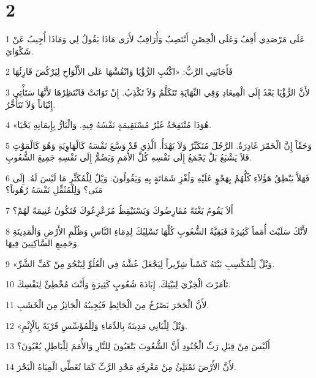 \chapter{2}

\par 1 عَلَى مَرْصَدِي أَقِفُ وَعَلَى الْحِصْنِ أَنْتَصِبُ وَأُرَاقِبُ لأَرَى مَاذَا يَقُولُ لِي وَمَاذَا أُجِيبُ عَنْ شَكْوَايَ.
\par 2 فَأَجَابَنِي الرَّبُّ: «اكْتُبِ الرُّؤْيَا وَانْقُشْهَا عَلَى الأَلْوَاحِ لِيَرْكُضَ قَارِئُهَا
\par 3 لأَنَّ الرُّؤْيَا بَعْدُ إِلَى الْمِيعَادِ وَفِي النِّهَايَةِ تَتَكَلَّمُ وَلاَ تَكْذِبُ. إِنْ تَوَانَتْ فَانْتَظِرْهَا لأَنَّهَا سَتَأْتِي إِتْيَاناً وَلاَ تَتَأَخَّرُ.
\par 4 «هُوَذَا مُنْتَفِخَةٌ غَيْرُ مُسْتَقِيمَةٍ نَفْسُهُ فِيهِ. وَالْبَارُّ بِإِيمَانِهِ يَحْيَا.
\par 5 وَحَقّاً إِنَّ الْخَمْرَ غَادِرَةٌ. الرَّجُلَ مُتَكَبِّرٌ وَلاَ يَهْدَأُ. الَّذِي قَدْ وَسَّعَ نَفْسَهُ كَالْهَاوِيَةِ وَهُوَ كَالْمَوْتِ فَلاَ يَشْبَعُ بَلْ يَجْمَعُ إِلَى نَفْسِهِ كُلَّ الأُمَمِ وَيَضُمُّ إِلَى نَفْسِهِ جَمِيعَ الشُّعُوبِ.
\par 6 فَهَلاَّ يَنْطِقُ هَؤُلاَءِ كُلُّهُمْ بِهَجْوٍ عَلَيْهِ وَلُغْزِ شَمَاتَةٍ بِهِ وَيَقُولُونَ: وَيْلٌ لِلْمُكَثِّرِ مَا لَيْسَ لَهُ. إِلَى مَتَى؟ وَلِلْمُثَقِّلِ نَفْسَهُ رُهُوناً؟
\par 7 أَلاَ يَقُومُ بَغْتَةً مُقَارِضُوكَ وَيَسْتَيْقِظُ مُزَعْزِعُوكَ فَتَكُونُ غَنِيمَةً لَهُمْ؟
\par 8 لأَنَّكَ سَلَبْتَ أُمَماً كَثِيرَةً فَبَقِيَّةُ الشُّعُوبِ كُلِّهَا تَسْلِبُكَ لِدِمَاءِ النَّاسِ وَظُلْمِ الأَرْضِ وَالْمَدِينَةِ وَجَمِيعِ السَّاكِنِينَ فِيهَا.
\par 9 «وَيْلٌ لِلْمُكْسِبِ بَيْتَهُ كَسْباً شِرِّيراً لِيَجْعَلَ عُشَّهُ فِي الْعُلُوِّ لِيَنْجُوَ مِنْ كَفِّ الشَّرِّ.
\par 10 تَآمَرْتَ الْخِزْيَ لِبَيْتِكَ. إِبَادَةَ شُعُوبٍ كَثِيرَةٍ وَأَنْتَ مُخْطِئٌ لِنَفْسِكَ.
\par 11 لأَنَّ الْحَجَرَ يَصْرُخُ مِنَ الْحَائِطِ فَيُجِيبُهُ الْجَائِزُ مِنَ الْخَشَبِ.
\par 12 «وَيْلٌ لِلْبَانِي مَدِينَةً بِالدِّمَاءِ وَلِلْمُؤَسِّسِ قَرْيَةً بِالْإِثْمِ.
\par 13 أَلَيْسَ مِنْ قِبَلِ رَبِّ الْجُنُودِ أَنَّ الشُّعُوبَ يَتْعَبُونَ لِلنَّارِ وَالأُمَمَ لِلْبَاطِلِ يُعْيُونَ؟
\par 14 لأَنَّ الأَرْضَ تَمْتَلِئُ مِنْ مَعْرِفَةِ مَجْدِ الرَّبِّ كَمَا تُغَطِّي الْمِيَاهُ الْبَحْرَ.
